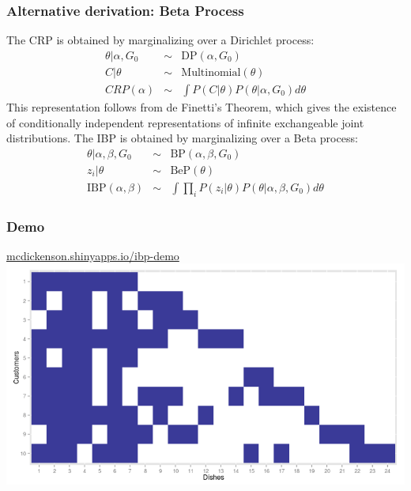 \documentclass[13pt]{beamer}
\begin{document}
\begin{frame}
\frametitle{Alternative derivation: Beta Process}
The CRP is obtained by marginalizing over a Dirichlet process:
\begin{eqnarray*}
    \theta | \alpha, G_0 &\sim& \text{DP}(\alpha,G_0) \\
    C | \theta &\sim& \text{Multinomial}(\theta) \\
    CRP(\alpha) &\sim& \int P(C | \theta) P(\theta | \alpha, G_0) d\theta 
\end{eqnarray*}
This representation follows from de Finetti's Theorem, which gives the existence of conditionally independent representations of infinite exchangeable joint distributions.
The IBP is obtained by marginalizing over a Beta process:
\begin{eqnarray*}
    \theta | \alpha, \beta, G_0 &\sim& \text{BP}(\alpha, \beta, G_0) \\
    z_i | \theta &\sim& \text{BeP}(\theta) \\
    \text{IBP}(\alpha, \beta) &\sim& \int \prod_i P(z_i | \theta) P(\theta | \alpha, \beta, G_0) d\theta 
\end{eqnarray*}
\end{frame}
\begin{frame}
\frametitle{Demo}

\begin{center}
\href{http://mcdickenson.shinyapps.io/ibp-demo}{mcdickenson.shinyapps.io/ibp-demo}
\includegraphics[scale=0.4]{./img/ibp-shiny-demo.png}
\end{center}

\end{frame}
\end{document}
